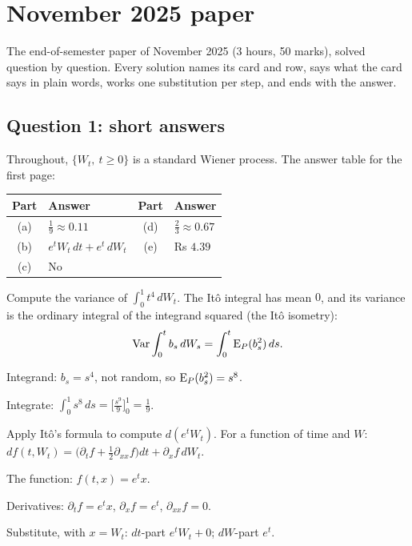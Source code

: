 \chapter{November 2025 paper}
\label{ch:paper-2025-nov}

\begin{whatfor}
The end-of-semester paper of November 2025 (3 hours, 50 marks), solved question by question. Every solution names its card and row, says what the card says in plain words, works one substitution per step, and ends with the answer.
\end{whatfor}

\section{Question 1: short answers}

Throughout, $\{W_t,\ t\ge0\}$ is a standard Wiener process. The answer table for the first page:

\begin{center}
\begin{tabular}{@{}cl@{\qquad}cl@{}}
\toprule
Part & Answer & Part & Answer\\
\midrule
(a) & $\frac19\approx0.11$ & (d) & $\frac23\approx0.67$\\
(b) & $e^tW_t\,dt+e^t\,dW_t$ & (e) & Rs $4.39$\\
(c) & No & &\\
\bottomrule
\end{tabular}
\end{center}

\begin{problem}[Q1(a)]
Compute the variance of $\int_0^1t^4\,dW_t$.
\cardsays The Itô integral has mean $0$, and its variance is the ordinary integral of the integrand squared (the Itô isometry):
\[
\operatorname{Var}\int_0^tb_s\,dW_s=\int_0^t\operatorname{E}_P(b_s^2)\,ds.
\]
\working
\begin{steps}
\item Integrand: $b_s=s^4$, not random, so $\operatorname{E}_P(b_s^2)=s^8$.
\item Integrate: $\int_0^1s^8\,ds=\Big[\frac{s^9}9\Big]_0^1=\frac19$.
\end{steps}
\end{problem}

\begin{problem}[Q1(b)]
Apply Itô's formula to compute $d(e^tW_t)$.
\cardsays For a function of time and $W$: $df(t,W_t)=\big(\partial_tf+\frac12\partial_{xx}f\big)dt+\partial_xf\,dW_t$.
\working
\begin{steps}
\item The function: $f(t,x)=e^tx$.
\item Derivatives: $\partial_tf=e^tx$, $\partial_xf=e^t$, $\partial_{xx}f=0$.
\item Substitute, with $x=W_t$: $dt$-part $e^tW_t+0$; $dW$-part $e^t$.
\end{steps}
\end{problem}


